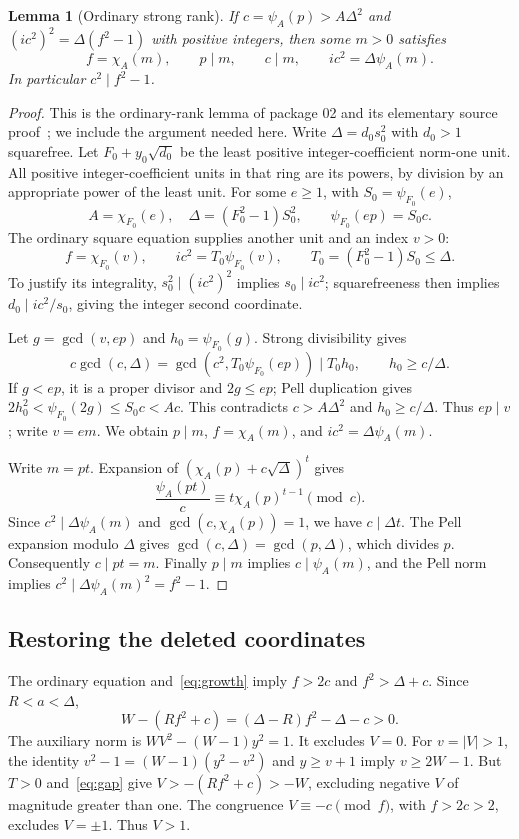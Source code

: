 \documentclass[11pt,a4paper]{article}
\newtheorem{lemma}[theorem]{Lemma}
\theoremstyle{remark}\newtheorem{remark}[theorem]{Remark}
\begin{document}
\begin{lemma}[Ordinary strong rank]\label{lem:ordinaryrank}
If \(c=\psi_A(p)>A\Delta^2\) and
\((ic^2)^2=\Delta(f^2-1)\) with positive integers, then some \(m>0\)
satisfies
\[
 f=\chi_A(m),\qquad p\mid m,\qquad c\mid m,
 \qquad ic^2=\Delta\psi_A(m).
\]
In particular \(c^2\mid f^2-1\).
\end{lemma}
\begin{proof}
This is the ordinary-rank lemma of package 02 and its elementary source
proof~\cite{ordinary,relaxed}; we include the argument needed here.
Write \(\Delta=d_0s_0^2\) with \(d_0>1\) squarefree. Let
\(F_0+y_0\sqrt{d_0}\) be the least positive integer-coefficient
norm-one unit. All positive integer-coefficient units in that ring are
its powers, by division by an appropriate power of the least unit.
For some \(e\ge1\), with \(S_0=\psi_{F_0}(e)\),
\[
 A=\chi_{F_0}(e),\quad\Delta=(F_0^2-1)S_0^2,
 \qquad\psi_{F_0}(ep)=S_0c.
\]
The ordinary square equation supplies another unit and an index \(v>0\):
\[
 f=\chi_{F_0}(v),\qquad ic^2=T_0\psi_{F_0}(v),
 \qquad T_0=(F_0^2-1)S_0\le\Delta.
\]
To justify its integrality, \(s_0^2\mid(ic^2)^2\) implies
\(s_0\mid ic^2\); squarefreeness then implies
\(d_0\mid ic^2/s_0\), giving the integer second coordinate.

Let \(g=\gcd(v,ep)\) and \(h_0=\psi_{F_0}(g)\).
Strong divisibility gives
\[
 c\gcd(c,\Delta)=\gcd(c^2,T_0\psi_{F_0}(ep))\mid T_0h_0,
 \qquad h_0\ge c/\Delta.
\]
If \(g<ep\), it is a proper divisor and \(2g\le ep\); Pell
duplication gives \(2h_0^2<\psi_{F_0}(2g)\le S_0c<Ac\).
This contradicts \(c>A\Delta^2\) and \(h_0\ge c/\Delta\).
Thus \(ep\mid v\); write \(v=em\). We obtain \(p\mid m\),
\(f=\chi_A(m)\), and \(ic^2=\Delta\psi_A(m)\).

Write \(m=pt\). Expansion of
\((\chi_A(p)+c\sqrt\Delta)^t\) gives
\[
 \frac{\psi_A(pt)}c\equiv t\chi_A(p)^{t-1}\pmod c.
\]
Since \(c^2\mid\Delta\psi_A(m)\) and \(\gcd(c,\chi_A(p))=1\),
we have \(c\mid\Delta t\). The Pell expansion modulo \(\Delta\)
gives \(\gcd(c,\Delta)=\gcd(p,\Delta)\), which divides \(p\).
Consequently \(c\mid pt=m\). Finally \(p\mid m\) implies
\(c\mid\psi_A(m)\), and the Pell norm implies
\(c^2\mid\Delta\psi_A(m)^2=f^2-1\).
\end{proof}

\subsection{Restoring the deleted coordinates}
The ordinary equation and~\eqref{eq:growth} imply \(f>2c\) and
\(f^2>\Delta+c\). Since \(R<a<\Delta\),
\begin{equation}
 W-(Rf^2+c)=(\Delta-R)f^2-\Delta-c>0.\label{eq:gap}
\end{equation}
The auxiliary norm is \(WV^2-(W-1)y^2=1\). It excludes \(V=0\).
For \(v=|V|>1\), the identity
\(v^2-1=(W-1)(y^2-v^2)\) and \(y\ge v+1\) imply
\(v\ge2W-1\). But \(T>0\) and~\eqref{eq:gap} give
\(V>-(Rf^2+c)>-W\), excluding negative \(V\) of magnitude greater
than one. The congruence \(V\equiv-c\pmod f\), with \(f>2c>2\),
excludes \(V=\pm1\). Thus \(V>1\).
\end{document}
